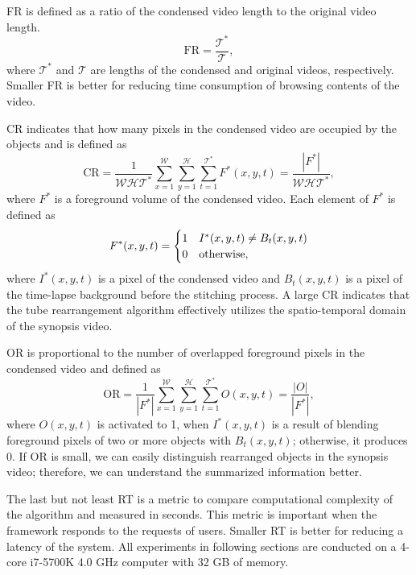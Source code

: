 \documentclass[11pt]{hyu_thesis}
\begin{document}
FR is defined as a ratio of the condensed video length to the original video length.
\begin{equation}
\textrm{FR} = \frac{\mathcal{T}^{*}}{\mathcal{T}},
\end{equation}
where $\mathcal{T}^{*}$ and $\mathcal{T}$ are lengths of the condensed and original videos, respectively. Smaller FR is better for reducing time consumption of browsing contents of the video.

CR indicates that how many pixels in the condensed video are occupied by the objects and is defined as
\begin{equation}
\label{eq:CR}
\textrm{CR}=\frac{1}{\mathcal{W}\mathcal{H}\mathcal{T}^{*}}\sum_{x=1}^{\mathcal{W}}\sum_{y=1}^{\mathcal{H}}\sum_{t=1}^{\mathcal{T}^{*}} F^{*}(x,y,t) = \frac{|F^{*}|}{\mathcal{W}\mathcal{H}\mathcal{T}^{*}},
\end{equation}
where $F^{*}$ is a foreground volume of the condensed video. Each element of $F^{*}$ is defined as
\begin{equation}
F^{*}(x,y,t)=
\begin{cases}
1 & I^{*}(x,y,t) \neq B_t(x,y,t)\\
0 & \rm{otherwise},
\end{cases}
\end{equation}
where $I^{*}(x,y,t)$ is a pixel of the condensed video and $B_t(x,y,t)$ is a pixel of the time-lapse background before the stitching process. A large CR indicates that the tube rearrangement algorithm effectively utilizes the spatio-temporal domain of the synopsis video.

OR is proportional to the number of overlapped foreground pixels in the condensed video and defined as
\begin{equation}
\textrm{OR}=\frac{1}{|F^{*}|}\sum_{x=1}^{\mathcal{W}}\sum_{y=1}^{\mathcal{H}}\sum_{t=1}^{\mathcal{T}^{*}} O(x,y,t)=\frac{|O|}{|F^{*}|},
\end{equation}
where $O(x,y,t)$ is activated to 1, when $I^{*}(x,y,t)$ is a result of blending foreground pixels of two or more objects with $B_t(x,y,t)$; otherwise, it produces 0. If OR is small, we can easily distinguish rearranged objects in the synopsis video; therefore, we can understand the summarized information better.

The last but not least RT is a metric to compare computational complexity of the algorithm and measured in seconds. This metric is important when the framework responds to the requests of users. Smaller RT is better for reducing a latency of the system. All experiments in following sections are conducted on a 4-core i7-5700K 4.0 GHz computer with 32 GB of memory. 
\end{document}
